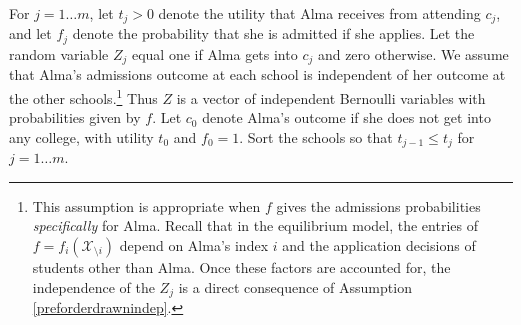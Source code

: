 \documentclass[12pt]{article} %
\theoremstyle{definition}
\theoremstyle{definition}
\begin{document}
For $j=1\dots m$, let $t_j > 0$ denote the utility that Alma receives from attending $c_j$, and let $f_j$ denote the probability that she is admitted if she applies. Let the random variable $Z_j$ equal one if Alma gets into $c_j$ and zero otherwise.  We assume that Alma’s admissions outcome at each school is independent of her outcome at the other schools.\footnote{This assumption is appropriate when $f$ gives the admissions probabilities \emph{specifically} for Alma. Recall that in the equilibrium model, the entries of $f = f_{i}(\mathcal{X}_{\setminus i})$ depend on Alma’s index $i$ and the application decisions of students other than Alma. Once these factors are accounted for, the independence of the $Z_j$ is a direct consequence of Assumption \ref{preforderdrawnindep}. } Thus $Z$ is a vector of independent Bernoulli variables with probabilities given by $f$. Let $c_0$ denote Alma's outcome if she does not get into any college, with utility $t_0$ and $f_0 = 1$. Sort the schools so that $t_{j-1} \leq t_j$ for $j=1 \dots m$.
\end{document}

